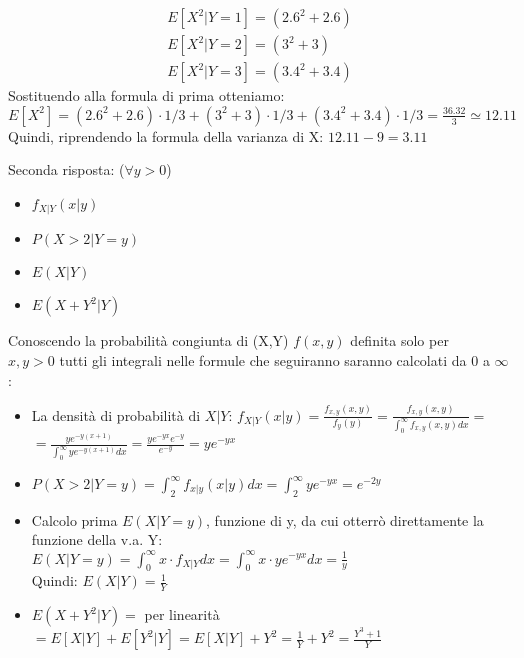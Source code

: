 \documentclass{oxmathproblems}
\begin{document}
\begin{questions}
\begin{solution}
    \[
        \begin{array}{l}
           E[X^2|Y=1] = (2.6^2+2.6) \\
            E[X^2|Y=2] = (3^2+3)\\
            E[X^2|Y=3] = (3.4^2+3.4)
        \end{array}
    \]
    Sostituendo alla formula di prima otteniamo:\\
    $E[X^2]=(2.6^2+2.6)\cdot1/3+(3^2+3)\cdot1/3+(3.4^2+3.4)\cdot1/3=\frac{36.32}{3}\simeq12.11$\\
    Quindi, riprendendo la formula della varianza di X: $12.11-9=3.11$
\end{solution}

\miquestion
Seconda risposta: ($\forall y > 0$)
\begin{itemize}
    \item $f_{X|Y}(x|y)$
    \item $P(X>2|Y=y)$
    \item $E(X|Y)$
    \item $E(X+Y^2|Y)$
\end{itemize}

\begin{solution}
    Conoscendo la probabilità congiunta di (X,Y) $f(x,y)$ definita solo per\\
    $x,y > 0$ tutti gli integrali nelle formule che seguiranno saranno calcolati da $0$ a $\infty$:
    \begin{itemize}
    \item La densità di probabilità di $X|Y$: $f_{X|Y}(x|y)=\frac{f_{x,y}(x,y)}{f_y(y)}=\frac{f_{x,y}(x,y)}{\int_0^\infty f_{x,y}(x,y) dx}=$\\$=\frac{ye^{-y(x+1)}}{\int_0^\infty ye^{-y(x+1)} dx}=\frac{ye^{-yx}e^{-y}}{e^{-y}}=ye^{-yx}$
    \item $P(X>2|Y=y)=\int_2^\infty f_{x|y}(x|y) dx=\int_2^\infty ye^{-yx}=e^{-2y}$
    \item Calcolo prima $E(X|Y=y)$, funzione di y, da cui otterrò direttamente la funzione della v.a. Y:\\ $E(X|Y=y)=\int_0^\infty x\cdot f_{X|Y}dx=\int_0^\infty x\cdot ye^{-yx}dx=\frac{1}{y}$\\
    Quindi: $E(X|Y)=\frac{1}{Y}$
    \item $E(X+Y^2|Y)=$ per linearità $=E[X|Y]+E[Y^2|Y]=E[X|Y]+Y^2=\frac{1}{Y}+Y^2=\frac{Y^3+1}{Y}$
\end{itemize}
\end{solution}


\end{questions}
\end{document}
